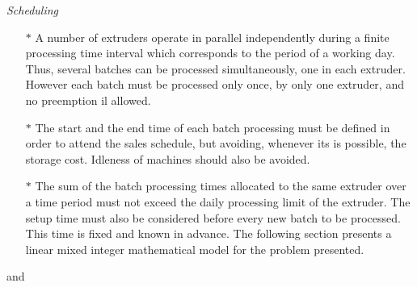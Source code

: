 \emph{Scheduling}

\begin{itemize}
\item [$\ast$] A number of extruders operate in parallel independently during a finite processing time interval which corresponds to the period of a working day. Thus, several batches can be processed simultaneously, one in each extruder. However each batch must be processed only once, by only one extruder, and no preemption il allowed. 
\item [$\ast$] The start and the end time of each batch processing must be defined in order to attend the sales schedule, but avoiding, whenever its is possible, the storage cost. Idleness of machines should also be avoided.
\item [$\ast$] The sum of the batch processing times allocated to the same extruder over a time period must not exceed the daily processing limit of the extruder. The setup time must also be considered before every new batch to be processed. This time is fixed and known in advance. The following section presents a linear mixed integer mathematical model for the problem presented.
\end{itemize}


and \cite{RefJ}
